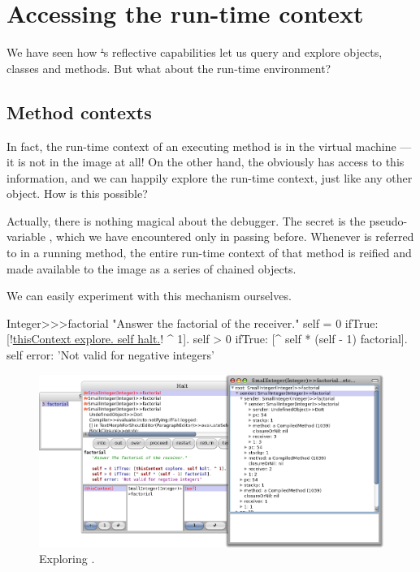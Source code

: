 \documentclass[a4paper,10pt,twoside]{book}
\begin{document}
\section{Accessing the run-time context}

We have seen how \st's reflective capabilities let us query and explore objects, classes and methods.  But what about the run-time environment?

\subsection{Method contexts}

In fact, the run-time context of an executing method is in the virtual machine --- it is not in the image at all!
On the other hand, the  obviously has access to this information, and we can happily explore the run-time context, just like any other object.
How is this possible?

Actually, there is nothing magical about the debugger.
The secret is the pseudo-variable , which we have encountered only in passing before.
Whenever  is referred to in a running method, the entire run-time context of that method is reified and made available to the image as a series of chained  objects.

We can easily experiment with this mechanism ourselves.


\begin{code}{}
Integer>>>factorial
	"Answer the factorial of the receiver."
	self = 0 ifTrue: [!\underline{thisContext explore. self halt.}! ^ 1].
	self > 0 ifTrue: [^ self * (self - 1) factorial].
	self error: 'Not valid for negative integers'
\end{code}


\begin{figure}[ht]\centering
	\includegraphics[width=\linewidth]{exploringThisContext}
	\caption{Exploring .}
\end{figure}
\end{document}
